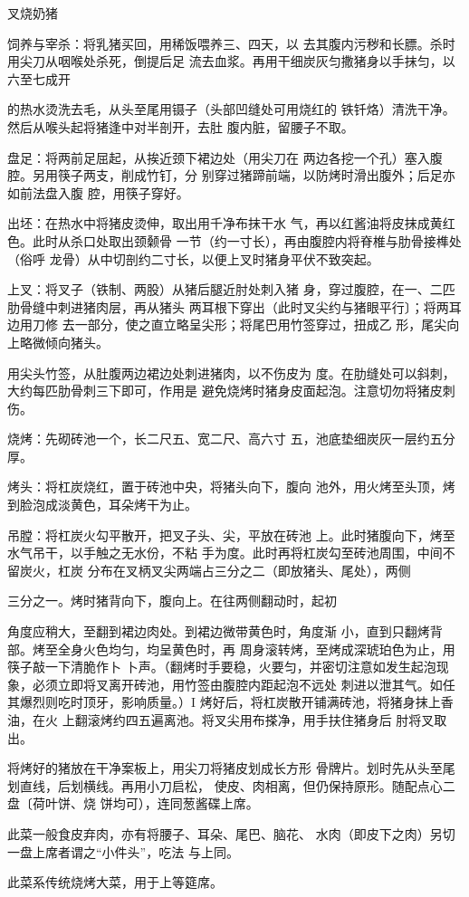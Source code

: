 \begin{recipe}{叉烧奶猪}

\ingredients


\cooking

\step 饲养与宰杀：将乳猪买回，用稀饭喂养三、四天，以 去其腹内污秽和长膘。杀时用尖刀从咽喉处杀死，倒提后足 流去血浆。再用干细炭灰匀撒猪身以手抹匀，以六至七成开

的热水烫洗去毛，从头至尾用镊子（头部凹缝处可用烧红的 铁钎烙）清洗干净。然后从喉头起将猪逢中对半剖开，去肚 腹内脏，留腰子不取。

\step 	盘足：将两前足屈起，从挨近颈下裙边处（用尖刀在 两边各挖一个孔）塞入腹腔。另用筷子两支，削成竹钉，分 别穿过猪蹄前端，以防烤时滑出腹外；后足亦如前法盘入腹 腔，用筷子穿好。

\step 	出坯：在热水中将猪皮烫伸，取出用千净布抹干水 气，再以红酱油将皮抹成黄红色。此时从杀口处取出颈颡骨 一节（约一寸长），再由腹腔内将脊椎与肋骨接榫处（俗呼 龙骨）从中切剖约二寸长，以便上叉时猪身平伏不致突起。

上叉：将叉子（铁制、两股）从猪后腿近肘处刺入猪 身，穿过腹腔，在一、二匹肋骨缝中刺进猪肉层，再从猪头 两耳根下穿出（此时叉尖约与猪眼平行〕；将两耳边用刀修 去一部分，使之直立略呈尖形；将尾巴用竹签穿过，扭成乙 形，尾尖向上略微倾向猪头。

用尖头竹签，从肚腹两边裙边处刺进猪肉，以不伤皮为 度。在肋缝处可以斜刺，大约每匹肋骨刺三下即可，作用是 避免烧烤时猪身皮面起泡。注意切勿将猪皮刺伤。

\step 烧烤：先砌砖池一个，长二尺五、宽二尺、高六寸 五，池底垫细炭灰一层约五分厚。

\step 烤头：将杠炭烧红，置于砖池中央，将猪头向下，腹向 池外，用火烤至头顶，烤到脸泡成淡黄色，耳朵烤干为止。

\step 吊膛：将杠炭火勾平散开，把叉子头、尖，平放在砖池 上。此时猪腹向下，烤至水气吊干，以手触之无水份，不粘 手为度。此时再将杠炭勾至砖池周围，中间不留炭火，杠炭 分布在叉柄叉尖两端占三分之二（即放猪头、尾处），两侧

三分之一。烤时猪背向下，腹向上。在往两侧翻动时，起初

角度应稍大，至翻到裙边肉处。到裙边微带黄色时，角度渐 小，直到只翻烤背部。烤至全身火色均匀，均呈黄色时，再 周身滚转烤，至烤成深琥珀色为止，用筷子敲一下清脆作卜 卜声。（翻烤时手要稳，火要匀，并密切注意如发生起泡现 象，必须立即将叉离开砖池，用竹签由腹腔内距起泡不远处 刺进以泄其气。如任其爆烈则吃时顶牙，影响质量。）I 烤好后，将杠炭散开铺满砖池，将猪身抹上香油，在火 上翻滚烤约四五遍离池。将叉尖用布搽净，用手扶住猪身后 肘将叉取出。

将烤好的猪放在干净案板上，用尖刀将猪皮划成长方形 骨牌片。划时先从头至尾划直线，后划横线。再用小刀启松， 使皮、肉相离，但仍保持原形。随配点心二盘〔荷叶饼、烧 饼均可），连同葱酱碟上席。

此菜一般食皮弃肉，亦有将腰子、耳朵、尾巴、脑花、 水肉（即皮下之肉）另切一盘上席者谓之“小件头”，吃法 与上同。

\notes

此菜系传统烧烤大菜，用于上等筵席。

\end{recipe}

